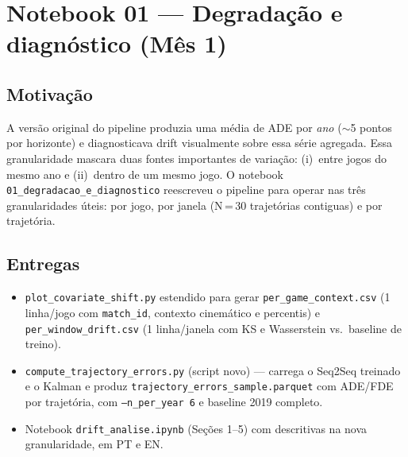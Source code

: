 \documentclass[11pt,a4paper]{article}
\begin{document}
\section{Notebook 01 --- Degrada\c{c}\~ao e diagn\'ostico (M\^es 1)}

\subsection{Motiva\c{c}\~ao}

A vers\~ao original do pipeline produzia uma m\'edia de ADE por
\emph{ano} ($\sim$5 pontos por horizonte) e diagnosticava drift
visualmente sobre essa s\'erie agregada. Essa granularidade mascara duas
fontes importantes de varia\c{c}\~ao: (i)~entre jogos do mesmo ano e
(ii)~dentro de um mesmo jogo. O notebook
\texttt{01\_degradacao\_e\_diagnostico} reescreveu o pipeline para
operar nas tr\^es granularidades \'uteis: por jogo, por janela
(N\,=\,30 trajet\'orias contiguas) e por trajet\'oria.

\subsection{Entregas}

\begin{itemize}[leftmargin=1.4em,itemsep=2pt]
    \item \texttt{plot\_covariate\_shift.py} estendido para gerar
          \texttt{per\_game\_context.csv} (1 linha/jogo com
          \texttt{match\_id}, contexto cinem\'atico e percentis) e
          \texttt{per\_window\_drift.csv} (1 linha/janela com KS e
          Wasserstein vs.\ baseline de treino).
    \item \texttt{compute\_trajectory\_errors.py} (script novo) ---
          carrega o Seq2Seq treinado e o Kalman e produz
          \texttt{trajectory\_errors\_sample.parquet} com ADE/FDE por
          trajet\'oria, com \texttt{--n\_per\_year 6} e
          baseline 2019 completo.
    \item Notebook \texttt{drift\_analise.ipynb} (Se\c{c}\~oes 1--5)
          com descritivas na nova granularidade, em PT e EN.
\end{itemize}
\end{document}
